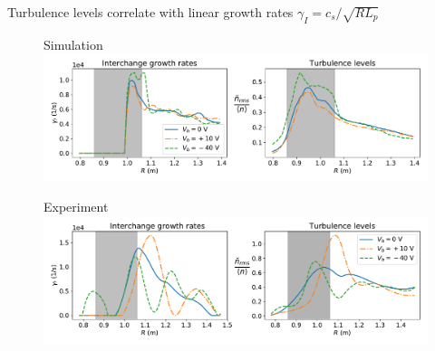 \documentclass[12pt,table]{beamer}
\begin{document}
\begin{frame}{Turbulence levels correlate with linear growth rates \small $\gamma_I = c_s/\sqrt{RL_p}$}
\vspace{-.5cm}
    \begin{figure}
        Simulation \\
        \includegraphics[width=.9\linewidth,left]{figs/gamma-dn-sim.pdf}
        \label{fig:my_label}
    \end{figure}
    \vspace{-.75cm}
    \begin{figure}
        Experiment \\
        \includegraphics[width=.9\linewidth,left]{figs/gamma-dn-exp.pdf}
        \label{fig:my_label}
    \end{figure}
\end{frame}
\end{document}
